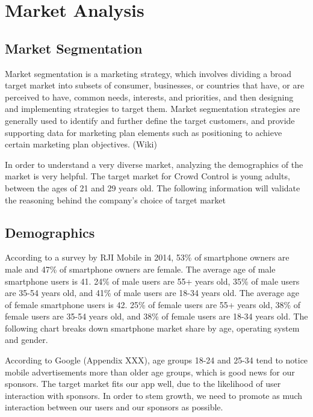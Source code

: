 

\chapter{Market Analysis} 

\section{Market Segmentation}

Market segmentation is a marketing strategy, which involves dividing a broad target market into subsets of consumer, businesses, or countries that have, or are perceived to have, common needs, interests, and priorities, and then designing and implementing strategies to target them. Market segmentation strategies are generally used to identify and further define the target customers, and provide supporting data for marketing plan elements such as positioning to achieve certain marketing plan objectives. (Wiki)

In order to understand a very diverse market, analyzing the demographics of the market is very helpful. The target market for Crowd Control is young adults, between the ages of 21 and 29 years old. The following information will validate the reasoning behind the company’s choice of target market

\section{Demographics}

According to a survey by RJI Mobile in 2014, 53\% of smartphone owners are male and 47\% of smartphone owners are female. The average age of male smartphone users is 41. 24\% of male users are 55+ years old, 35\% of male users are 35-54 years old, and 41\% of male users are 18-34 years old. The average age of female smartphone users is 42. 25\% of female users are 55+ years old, 38\% of female users are 35-54 years old, and 38\% of female users are 18-34 years old. The following chart breaks down smartphone market share by age, operating system and gender. 

According to Google (Appendix XXX), age groups 18-24 and 25-34 tend to notice mobile advertisements more than older age groups, which is good news for our sponsors. The target market fits our app well, due to the likelihood of user interaction with sponsors. In order to stem growth, we need to promote as much interaction between our users and our sponsors as possible.  

